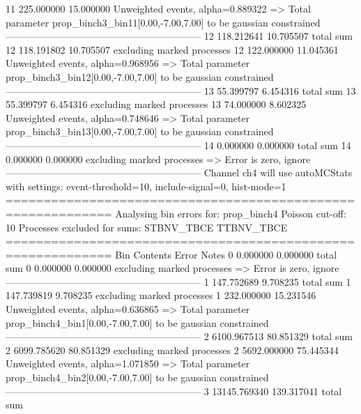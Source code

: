 11         225.000000      15.000000       Unweighted events, alpha=0.889322
  => Total parameter prop_binch3_bin11[0.00,-7.00,7.00] to be gaussian constrained
------------------------------------------------------------
12         118.212641      10.705507       total sum                     
12         118.191802      10.705507       excluding marked processes    
12         122.000000      11.045361       Unweighted events, alpha=0.968956
  => Total parameter prop_binch3_bin12[0.00,-7.00,7.00] to be gaussian constrained
------------------------------------------------------------
13         55.399797       6.454316        total sum                     
13         55.399797       6.454316        excluding marked processes    
13         74.000000       8.602325        Unweighted events, alpha=0.748646
  => Total parameter prop_binch3_bin13[0.00,-7.00,7.00] to be gaussian constrained
------------------------------------------------------------
14         0.000000        0.000000        total sum                     
14         0.000000        0.000000        excluding marked processes    
  => Error is zero, ignore      
------------------------------------------------------------
Channel ch4 will use autoMCStats with settings: event-threshold=10, include-signal=0, hist-mode=1
============================================================
Analysing bin errors for: prop_binch4
Poisson cut-off: 10
Processes excluded for sums: STBNV_TBCE TTBNV_TBCE
============================================================
Bin        Contents        Error           Notes                         
0          0.000000        0.000000        total sum                     
0          0.000000        0.000000        excluding marked processes    
  => Error is zero, ignore      
------------------------------------------------------------
1          147.752689      9.708235        total sum                     
1          147.739819      9.708235        excluding marked processes    
1          232.000000      15.231546       Unweighted events, alpha=0.636865
  => Total parameter prop_binch4_bin1[0.00,-7.00,7.00] to be gaussian constrained
------------------------------------------------------------
2          6100.967513     80.851329       total sum                     
2          6099.785620     80.851329       excluding marked processes    
2          5692.000000     75.445344       Unweighted events, alpha=1.071850
  => Total parameter prop_binch4_bin2[0.00,-7.00,7.00] to be gaussian constrained
------------------------------------------------------------
3          13145.769340    139.317041      total sum                     
